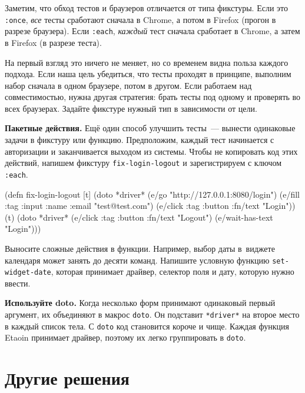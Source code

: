 
Заметим, что обход тестов и браузеров отличается от типа фикстуры. Если это
\verb|:once|, \emph{все} тесты сработают сначала в Chrome, а потом в Firefox
(прогон в разрезе браузера). Если \verb|:each|, \emph{каждый} тест сначала
сработает в Chrome, а затем в Firefox (в разрезе теста).

На первый взгляд это ничего не меняет, но со временем видна польза каждого
подхода. Если наша цель убедиться, что тесты проходят в принципе, выполним набор
сначала в одном браузере, потом в другом. Если работаем над совместимостью,
нужна другая стратегия: брать тесты под одному и проверять во всех
браузерах. Задайте фикстуре нужный тип в зависимости от цели.

\textbf{Пакетные действия.} Ещё один способ улучшить тесты~--- вынести
одинаковые задачи в фикстуру или функцию. Предположим, каждый тест начинается с
авторизации и заканчивается выходом из системы. Чтобы не копировать код этих
действий, напишем фикстуру \verb|fix-login-logout| и зарегистрируем с ключом
\verb|:each|.

\begin{english}
  \begin{clojure}
(defn fix-login-logout [t]
  (doto *driver*
    (e/go "http://127.0.0.1:8080/login")
    (e/fill {:tag :input :name :email} "test@test.com")
    (e/click {:tag :button :fn/text "Login"}))
  (t)
  (doto *driver*
    (e/click {:tag :button :fn/text "Logout"})
    (e/wait-has-text "Login")))
  \end{clojure}
\end{english}

Выносите сложные действия в функции. Например, выбор даты в~виджете календаря
может занять до десяти команд. Напишите условную функцию
\verb|set-widget-date|, которая принимает драйвер, селектор поля и дату,
которую нужно ввести.


\textbf{Используйте doto.} Когда несколько форм принимают одинаковый первый
аргумент, их объединяют в макрос \verb|doto|. Он подставит \verb|*driver*| на
второе место в каждый список тела. С \verb|doto| код становится короче и
чище. Каждая функция Etaoin принимает драйвер, поэтому их легко группировать в
\verb|doto|.

\section{Другие решения}

